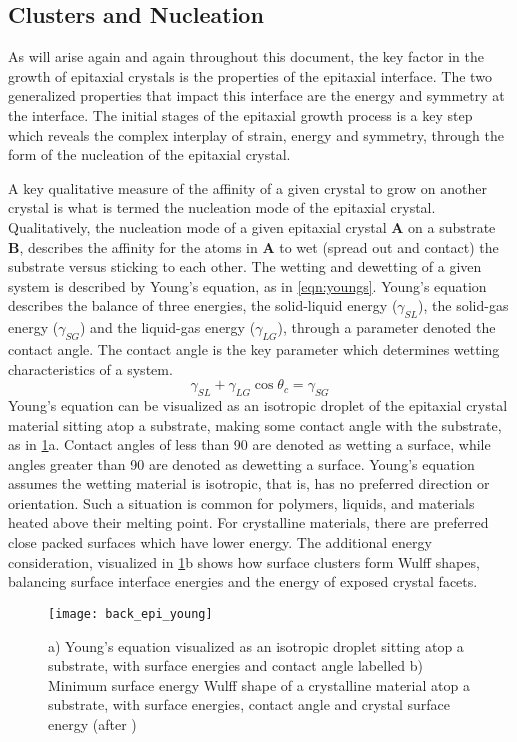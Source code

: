 \subsection{Clusters and Nucleation}
As will arise again and again throughout this document, the key factor in the growth of epitaxial crystals is the properties of the epitaxial interface. The two generalized properties that impact this interface are the energy and symmetry at the interface. The initial stages of the epitaxial growth process is a key step which reveals the complex interplay of strain, energy and symmetry, through the form of the nucleation of the epitaxial crystal.

A key qualitative measure of the affinity of a given crystal to grow on another crystal is what is termed the nucleation mode of the epitaxial crystal. Qualitatively, the nucleation mode of a given epitaxial crystal \textbf{A} on a substrate \textbf{B}, describes the affinity for the atoms in \textbf{A} to wet (spread out and contact) the substrate versus sticking to each other. The wetting and dewetting of a given system is described by Young's equation, as in \cref{eqn:youngs}. Young's equation describes the balance of three energies, the solid-liquid energy ($\gamma_{SL}$), the solid-gas energy ($\gamma_{SG}$) and the liquid-gas energy ($\gamma_{LG}$), through a parameter denoted the contact angle. The contact angle is the key parameter which determines wetting characteristics of a system.
\begin{equation}
\gamma_{SL} + \gamma_{LG} \cos{\theta_c} = \gamma_{SG} \label{eqn:youngs}
\end{equation}
Young's equation can be visualized as an isotropic droplet of the epitaxial crystal material sitting atop a substrate, making some contact angle with the substrate, as in \cref{fig:back_epi_young}a. Contact angles of less than 90\degree{} are denoted as wetting a surface, while angles greater than 90\degree{} are denoted as dewetting a surface. Young's equation assumes the wetting material is isotropic, that is, has no preferred direction or orientation. Such a situation is common for polymers, liquids, and materials heated above their melting point. For crystalline materials, there are preferred close packed surfaces which have lower energy. The additional energy consideration, visualized in \cref{fig:back_epi_young}b shows how surface clusters form Wulff shapes, balancing surface interface energies and the energy of exposed crystal facets\cite{Venables1984}.
\begin{figure}
    \centering
    \texttt{[image: back\_epi\_young]}
    \caption[Young's equation]{\label{fig:back_epi_young}a) Young's equation visualized as an isotropic droplet sitting atop a substrate, with surface energies and contact angle labelled b) Minimum surface energy Wulff shape of a crystalline material atop a substrate, with surface energies, contact angle and crystal surface energy (after \cite{wikipedia_surface_energy})}
\end{figure}


